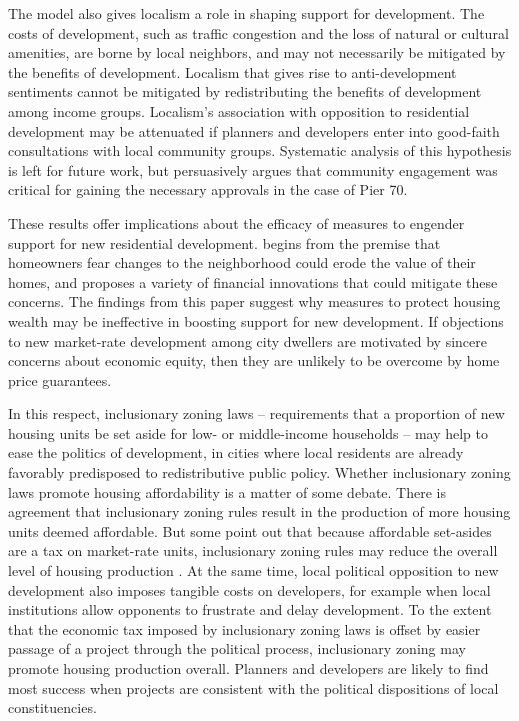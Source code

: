 \documentclass[article,11pt]{memoir}
\begin{document}
The model also gives localism a role in shaping support for development.  The costs of development, such as traffic congestion and the loss of natural or cultural amenities, are borne by local neighbors, and may not necessarily be mitigated by the benefits of development.  Localism that gives rise to anti-development sentiments cannot be mitigated by redistributing the benefits of development among income groups.  Localism's association with opposition to residential development may be attenuated if planners and developers enter into good-faith consultations with local community groups. Systematic analysis of this hypothesis is left for future work, but \citet{kuwada_shaping_2015} persuasively argues that community engagement was critical for gaining the necessary approvals in the case of Pier 70.

These results offer implications about the efficacy of measures to engender support for new residential development.  \citet{fischel_why_2001} begins from the premise that homeowners fear changes to the neighborhood could erode the value of their homes, and proposes a variety of financial innovations that could mitigate these concerns.  The findings from this paper suggest why measures to protect housing wealth may be ineffective in boosting support for new development. If objections to new market-rate development among city dwellers are motivated by sincere concerns about economic equity, then they are unlikely to be overcome by home price guarantees.  

In this respect, inclusionary zoning laws -- requirements that a proportion of new housing units be set aside for low- or middle-income households -- may help to ease the politics of development, in cities where local residents are already favorably predisposed to redistributive public policy.  Whether inclusionary zoning laws promote housing affordability is a matter of some debate. There is agreement that inclusionary zoning rules result in the production of more housing units deemed affordable. But some point out that because affordable set-asides are a tax on market-rate units, inclusionary zoning rules may reduce the overall level of housing production \citep[p. 82]{glaeser_rethinking_2008}. At the same time, local political opposition to new development also imposes tangible costs on developers, for example when local institutions allow opponents to frustrate and delay development.  To the extent that the economic tax imposed by inclusionary zoning laws is offset by easier passage of a project through the political process, inclusionary zoning may promote housing production overall.  Planners and developers are likely to find most success when projects are consistent with the political dispositions of local constituencies.
\end{document}
